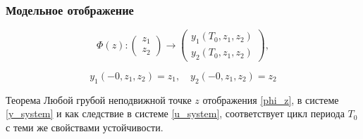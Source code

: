 \documentclass[fullscreen=true, unicode, bookmarks=false]{beamer}
\begin{document}
\begin{frame}
\frametitle{Модельное отображение} 

\begin{equation}\label{phi_z} 
	\Phi(z): \begin{pmatrix}
           z_1 \\
           z_2
          \end{pmatrix}
					\to
					\begin{pmatrix}
           y_1(T_0, z_1, z_2) \\
           y_2(T_0, z_1, z_2)
          \end{pmatrix},
\end{equation}

$$ y_1(-0, z_1, z_2) = z_1, \quad y_2(-0, z_1, z_2) = z_2 $$

\vfill

\begin{block}{Теорема} 
Любой грубой неподвижной точке $ z $ отображения \eqref{phi_z}, в системе \eqref{y_system} и как следствие в системе \eqref{u_system}, соответствует цикл периода $ T_0 $ с теми же свойствами устойчивости.
\end{block} 

\end{frame}
\end{document}
